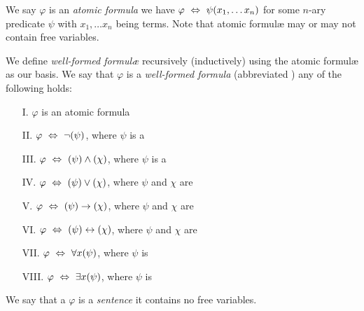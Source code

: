 \begin{definition}
    We say $\varphi$ is an \emph{atomic formula} \iffbydefn
    we have $\varphi \iff \psi\pn*{x_1, \dots x_n}$ for some $n$-ary predicate $\psi$
    with $x_1, \dots x_n$ being terms.
    Note that atomic formul{\ae} may or may not contain free variables.
\end{definition}

\begin{definition}
    We define \emph{well-formed formul{\ae}} recursively (\ie inductively) using the atomic formul{\ae} as our basis.
    We say that $\varphi$ is a \emph{well-formed formula} (abbreviated {\wff}) \iffbydefn
    any of the following holds:
    \begin{enumerate}
        \item[I.]
            $\varphi$ is an atomic formula
        \item[II.]
            $\varphi \iff \neg \pn*{\psi}$, where $\psi$ is a {\wff}
        \item[III.]
            $\varphi \iff \pn*{\psi} \meet \pn*{\chi}$, where $\psi$ is a {\wff}
        \item[IV.]
            $\varphi \iff \pn*{\psi} \join \pn*{\chi}$, where $\psi$ and $\chi$ are {\wff}
        \item[V.]
            $\varphi \iff \pn*{\psi} \rightarrow \pn*{\chi}$, where $\psi$ and $\chi$ are {\wff}
        \item[VI.]
            $\varphi \iff \pn*{\psi} \leftrightarrow \pn*{\chi}$, where $\psi$ and $\chi$ are {\wff}
        \item[VII.]
            $\varphi \iff \forall x \pn*{\psi}$, where $\psi$ is {\wff}
        \item[VIII.]
            $\varphi \iff \exists x \pn*{\psi}$, where $\psi$ is {\wff}
    \end{enumerate}
\end{definition}

\begin{definition}[Sentence]
    We say that a {\wff} $\varphi$ is a \emph{sentence} \iffbydefn it contains no free variables.
\end{definition}


